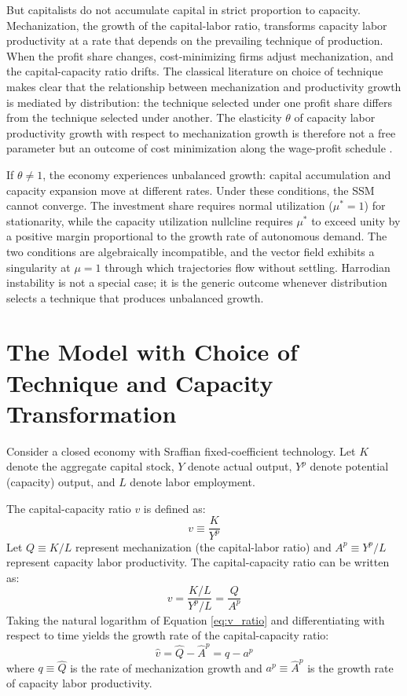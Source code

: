 \documentclass[12pt, a4paper]{article}
\theoremstyle{definition}
\theoremstyle{remark}
\begin{document}
But capitalists do not accumulate capital in strict proportion to capacity. Mechanization, the growth of the capital-labor ratio, transforms capacity labor productivity at a rate that depends on the prevailing technique of production. When the profit share changes, cost-minimizing firms adjust mechanization, and the capital-capacity ratio drifts. The classical literature on choice of technique \citep{kurz1995, pasinetti1981} makes clear that the relationship between mechanization and productivity growth is mediated by distribution: the technique selected under one profit share differs from the technique selected under another. The elasticity $\theta$ of capacity labor productivity growth with respect to mechanization growth is therefore not a free parameter but an outcome of cost minimization along the wage-profit schedule \citep{foley1999}.

If $\theta \neq 1$, the economy experiences unbalanced growth: capital accumulation and capacity expansion move at different rates. Under these conditions, the SSM cannot converge. The investment share requires normal utilization ($\mu^* = 1$) for stationarity, while the capacity utilization nullcline requires $\mu^*$ to exceed unity by a positive margin proportional to the growth rate of autonomous demand. The two conditions are algebraically incompatible, and the vector field exhibits a singularity at $\mu = 1$ through which trajectories flow without settling. Harrodian instability is not a special case; it is the generic outcome whenever distribution selects a technique that produces unbalanced growth.

\section{The Model with Choice of Technique and Capacity Transformation}

Consider a closed economy with Sraffian fixed-coefficient technology. Let $K$ denote the aggregate capital stock, $Y$ denote actual output, $Y^p$ denote potential (capacity) output, and $L$ denote labor employment.

The capital-capacity ratio $v$ is defined as:
\begin{equation} \label{eq:v_def}
    v \equiv \frac{K}{Y^p}
\end{equation}
Let $Q \equiv K/L$ represent mechanization (the capital-labor ratio) and $A^p \equiv Y^p/L$ represent capacity labor productivity. The capital-capacity ratio can be written as:
\begin{equation} \label{eq:v_ratio}
    v = \frac{K/L}{Y^p/L} = \frac{Q}{A^p}
\end{equation}
Taking the natural logarithm of Equation \eqref{eq:v_ratio} and differentiating with respect to time yields the growth rate of the capital-capacity ratio:
\begin{equation} \label{eq:v_growth}
    \hat{v} = \hat{Q} - \hat{A}^p = q - a^p
\end{equation}
where $q \equiv \hat{Q}$ is the rate of mechanization growth and $a^p \equiv \hat{A}^p$ is the growth rate of capacity labor productivity.
\end{document}
